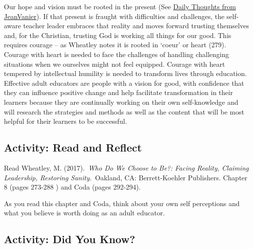 \documentclass[
]{book}
\begin{document}
Our hope and vision must be rooted in the present (See \href{http://quotetab.com/quotes/by-jean-vanier}{Daily Thoughts from JeanVanier}). If that present is fraught with difficulties and challenges, the self-aware teacher leader embraces that reality and moves forward trusting themselves and, for the Christian, trusting God is working all things for our good. This requires courage -- as Wheatley notes it is rooted in `coeur' or heart (279). Courage with heart is needed to face the challenges of handling challenging situations when we ourselves might not feel equipped. Courage with heart tempered by intellectual humility is needed to transform lives through education. Effective adult educators are people with a vision for good, with confidence that they can influence positive change and help facilitate transformation in their learners because they are continually working on their own self-knowledge and will research the strategies and methods as well as the content that will be most helpful for their learners to be successful.

\hypertarget{activity-read-and-reflect-1}{%
\subsection{Activity: Read and Reflect}\label{activity-read-and-reflect-1}}

\begin{reflect}
Read Wheatley, M. (2017).~\emph{Who Do We Choose to Be?: Facing Reality,
Claiming Leadership, Restoring Sanity.}~Oakland, CA: Berrett-Koehler
Publishers. Chapter 8 (pages 273-288 ) and Coda (pages 292-294).

As you read this chapter and Coda, think about your own self perceptions
and what you believe is worth doing as an adult educator.
\end{reflect}

\hypertarget{activity-did-you-know}{%
\subsection{Activity: Did You Know?}\label{activity-did-you-know}}
\end{document}
